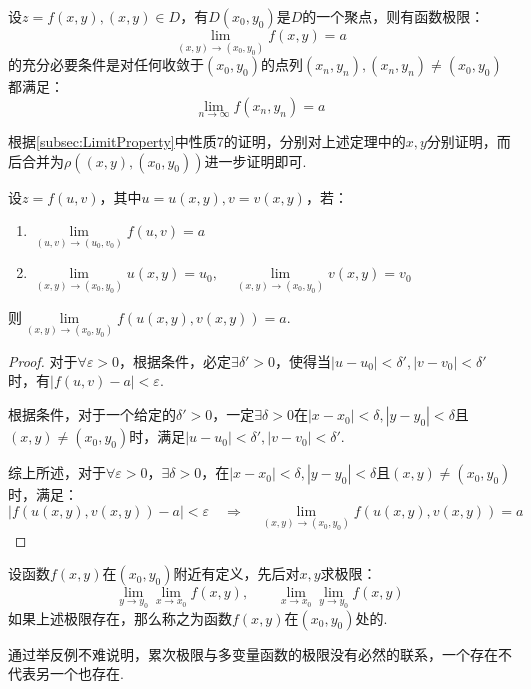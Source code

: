 \begin{theorem}
    设$z=f(x,y),(x,y)\in D$，有$D(x_0,y_0)$是$D$的一个聚点，则有函数极限：
    \[\lim_{(x,y)\to(x_0,y_0)}f(x,y) = a\]
    的充分必要条件是对任何收敛于$(x_0,y_0)$的点列$(x_n,y_n),(x_n,y_n)\neq(x_0,y_0)$都满足：
    \[\lim_{n \to \infty}f(x_n,y_n) = a\]
\end{theorem}

根据\cref{subsec:LimitProperty}中性质7的证明，分别对上述定理中的$x,y$分别证明，而后合并为$\rho((x,y),(x_0,y_0))$进一步证明即可.

\begin{theorem}
    设$z = f(u,v)$，其中$u=u(x,y),v=v(x,y)$，若：
    \begin{enumerate}[circ]
        \item $\lim\limits_{(u,v) \to (u_0,v_0)}f(u,v) = a$
        \vspace{0.5em}
        \item $\lim\limits_{(x,y) \to (x_0,y_0)}u(x,y) = u_0,\quad \lim\limits_{(x,y) \to (x_0,y_0)}v(x,y) = v_0$
    \end{enumerate}
    则$\lim\limits_{(x,y) \to (x_0,y_0)}f(u(x,y),v(x,y)) = a$.
\end{theorem}

\begin{proof}
    对于$\forall \varepsilon > 0$，根据条件，必定$\exists\delta' > 0$，使得当$|u-u_0|<\delta',|v-v_0|<\delta'$时，有$|f(u,v)-a|<\varepsilon$.

    根据条件，对于一个给定的$\delta'>0$，一定$\exists \delta>0$在$|x-x_0|<\delta,|y-y_0|<\delta$且$(x,y)\neq(x_0,y_0)$时，满足$|u-u_0|<\delta',|v-v_0|<\delta'$.

    综上所述，对于$\forall \varepsilon>0$，$\exists \delta>0$，在$|x-x_0|<\delta,|y-y_0|<\delta$且$(x,y)\neq(x_0,y_0)$时，满足：
    \[|f(u(x,y),v(x,y))-a|<\varepsilon \quad\Rightarrow\quad \lim_{(x,y) \to (x_0,y_0)}f(u(x,y),v(x,y)) = a\]
\end{proof}

\begin{definition}
    设函数$f(x,y)$在$(x_0,y_0)$附近有定义，先后对$x,y$求极限：
    \[\lim_{y \to y_0} \lim_{x \to x_0}f(x,y),\qquad \lim_{x \to x_0} \lim_{y \to y_0}f(x,y)\]
    如果上述极限存在，那么称之为函数$f(x,y)$在$(x_0,y_0)$处的.
\end{definition}

通过举反例不难说明，累次极限与多变量函数的极限没有必然的联系，一个存在不代表另一个也存在.

